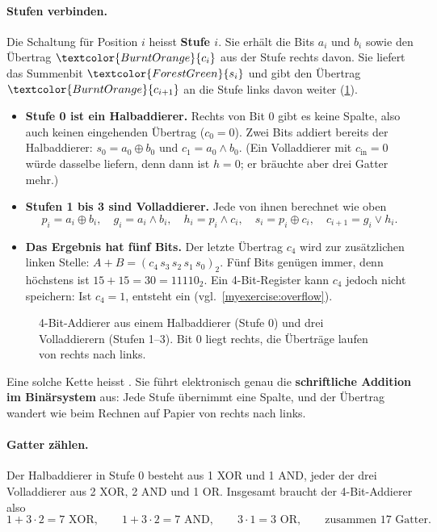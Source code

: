 \paragraph{Stufen verbinden.}
Die Schaltung für Position $i$ heisst \textbf{Stufe $i$}. Sie erhält die Bits $a_i$ und $b_i$ sowie den Übertrag $\textcolor{BurntOrange}{c_i}$ aus der Stufe rechts davon. Sie liefert das Summenbit $\textcolor{ForestGreen}{s_i}$ und gibt den Übertrag $\textcolor{BurntOrange}{c_{i+1}}$ an die Stufe links davon weiter (\cref{fig:4bit_addierer}).
\begin{itemize}
    \item \textbf{Stufe 0 ist ein Halbaddierer.} Rechts von Bit 0 gibt es keine Spalte, also auch keinen eingehenden Übertrag ($c_0 = 0$). Zwei Bits addiert bereits der Halbaddierer: $s_0 = a_0 \oplus b_0$ und $c_1 = a_0 \land b_0$. (Ein Volladdierer mit $c_{\text{in}} = 0$ würde dasselbe liefern, denn dann ist $h = 0$; er bräuchte aber drei Gatter mehr.)
    \item \textbf{Stufen 1 bis 3 sind Volladdierer.} Jede von ihnen berechnet wie oben
    \[
        p_i = a_i \oplus b_i, \quad g_i = a_i \land b_i, \quad h_i = p_i \land c_i, \quad s_i = p_i \oplus c_i, \quad c_{i+1} = g_i \lor h_i.
    \]
    \item \textbf{Das Ergebnis hat fünf Bits.} Der letzte Übertrag $c_4$ wird zur zusätzlichen linken Stelle: $A + B = (c_4\,s_3\,s_2\,s_1\,s_0)_2$. Fünf Bits genügen immer, denn höchstens ist $15 + 15 = 30 = 11110_2$. Ein 4-Bit-Register kann $c_4$ jedoch nicht speichern: Ist $c_4 = 1$, entsteht ein  (vgl.\ \cref{myexercise:overflow}).
\end{itemize}

\begin{figure}[H]
    \centering
    
    \caption{4-Bit-Addierer aus einem Halbaddierer (Stufe 0) und drei Volladdierern (Stufen 1--3). Bit 0 liegt rechts, die Überträge laufen von rechts nach links.}
    \label{fig:4bit_addierer}
\end{figure}

Eine solche Kette heisst . Sie führt elektronisch genau die \textbf{schriftliche Addition im Binärsystem} aus: Jede Stufe übernimmt eine Spalte, und der Übertrag wandert wie beim Rechnen auf Papier von rechts nach links.

\paragraph{Gatter zählen.}
Der Halbaddierer in Stufe 0 besteht aus 1 XOR und 1 AND, jeder der drei Volladdierer aus 2 XOR, 2 AND und 1 OR. Insgesamt braucht der 4-Bit-Addierer also
\[
    1 + 3 \cdot 2 = 7 \text{ XOR}, \qquad 1 + 3 \cdot 2 = 7 \text{ AND}, \qquad 3 \cdot 1 = 3 \text{ OR}, \qquad \text{zusammen } 17 \text{ Gatter.}
\]

